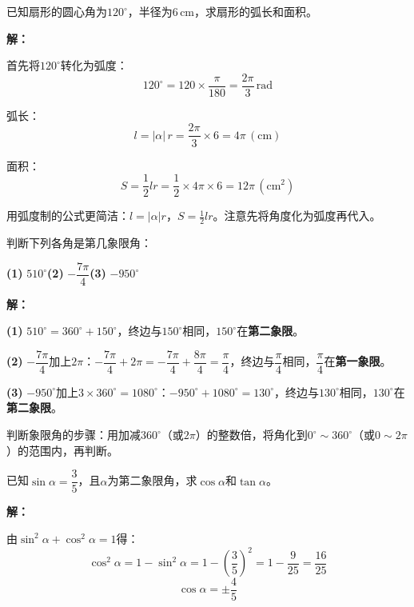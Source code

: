 \documentclass[12pt, a4paper]{ctexart}
\begin{document}
\begin{examplebox}[【例题2】扇形的弧长与面积]
已知扇形的圆心角为$120^\circ$，半径为$6\,\text{cm}$，求扇形的弧长和面积。
\end{examplebox}

\textbf{解：}

首先将$120^\circ$转化为弧度：
\[
  120^\circ=120\times\frac{\pi}{180}=\frac{2\pi}{3}\,\text{rad}
\]

弧长：
\[
  l=|\alpha|\,r=\frac{2\pi}{3}\times6=4\pi\,(\text{cm})
\]

面积：
\[
  S=\frac{1}{2}lr=\frac{1}{2}\times4\pi\times6=12\pi\,(\text{cm}^2)
\]

\begin{tipbox}[方法总结]
用弧度制的公式更简洁：$l=|\alpha|r$，$S=\frac{1}{2}lr$。注意先将角度化为弧度再代入。
\end{tipbox}

\begin{examplebox}[【例题3】判断角所在的象限]
判断下列各角是第几象限角：

\textbf{(1)} $510^\circ$\qquad\textbf{(2)} $-\dfrac{7\pi}{4}$\qquad\textbf{(3)} $-950^\circ$
\end{examplebox}

\textbf{解：}

\textbf{(1)} $510^\circ=360^\circ+150^\circ$，终边与$150^\circ$相同，$150^\circ$在\textbf{第二象限}。

\textbf{(2)} $-\dfrac{7\pi}{4}$加上$2\pi$：$-\dfrac{7\pi}{4}+2\pi=-\dfrac{7\pi}{4}+\dfrac{8\pi}{4}=\dfrac{\pi}{4}$，终边与$\dfrac{\pi}{4}$相同，$\dfrac{\pi}{4}$在\textbf{第一象限}。

\textbf{(3)} $-950^\circ$加上$3\times360^\circ=1080^\circ$：$-950^\circ+1080^\circ=130^\circ$，终边与$130^\circ$相同，$130^\circ$在\textbf{第二象限}。

\begin{tipbox}[方法总结]
判断象限角的步骤：用加减$360^\circ$（或$2\pi$）的整数倍，将角化到$0^\circ\sim360^\circ$（或$0\sim2\pi$）的范围内，再判断。
\end{tipbox}

\begin{examplebox}[【例题4】已知三角函数值求其他三角函数值]
已知$\sin\alpha=\dfrac{3}{5}$，且$\alpha$为第二象限角，求$\cos\alpha$和$\tan\alpha$。
\end{examplebox}

\textbf{解：}

由$\sin^2\alpha+\cos^2\alpha=1$得：
\[
  \cos^2\alpha=1-\sin^2\alpha=1-\left(\frac{3}{5}\right)^2=1-\frac{9}{25}=\frac{16}{25}
\]
\[
  \cos\alpha=\pm\frac{4}{5}
\]
\end{document}
